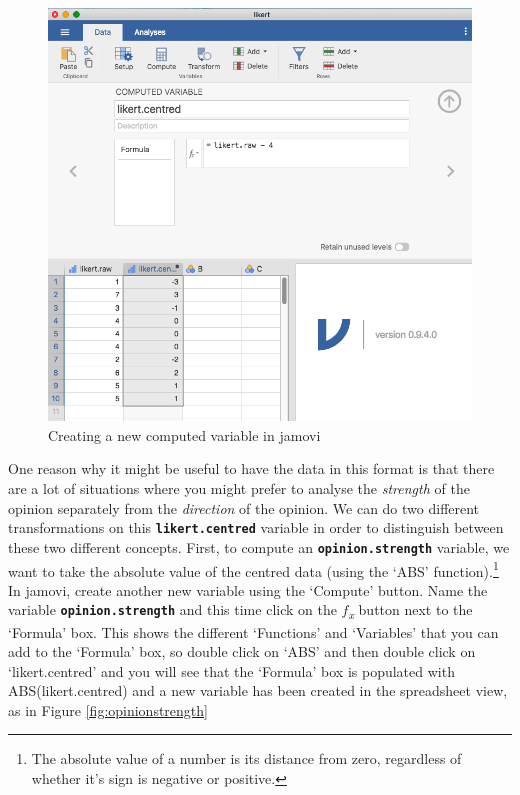 \documentclass[
]{book}
\begin{document}
\begin{figure}

{\centering \includegraphics[width=1\linewidth]{img/mechanics/likertraw} 

}

\caption{Creating a new computed variable in jamovi}\label{fig:likertraw}
\end{figure}

One reason why it might be useful to have the data in this format is that there are a lot of situations where you might prefer to analyse the \emph{strength} of the opinion separately from the \emph{direction} of the opinion. We can do two different transformations on this \textbf{\texttt{likert.centred}} variable in order to distinguish between these two different concepts. First, to compute an \textbf{\texttt{opinion.strength}} variable, we want to take the absolute value of the centred data (using the `ABS' function).\footnote{The absolute value of a number is its distance from zero, regardless of whether it's sign is negative or positive.} In jamovi, create another new variable using the `Compute' button. Name the variable \textbf{\texttt{opinion.strength}} and this time click on the \emph{\(f\)\textsubscript{x}} button next to the `Formula' box. This shows the different `Functions' and `Variables' that you can add to the `Formula' box, so double click on `ABS' and then double click on `likert.centred' and you will see that the `Formula' box is populated with ABS(likert.centred) and a new variable has been created in the spreadsheet view, as in Figure \ref{fig:opinionstrength}
\end{document}
